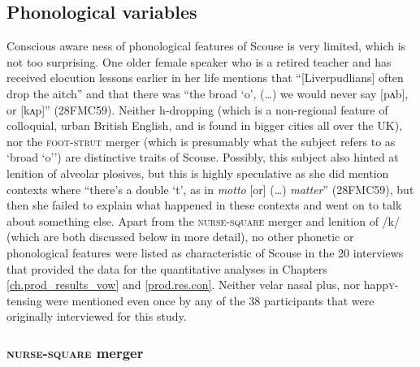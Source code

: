\subsection{Phonological variables}
\label{aware_res.phon}

Conscious aware ness of phonological features of Scouse is very limited, which is not too surprising.
One older female speaker who is a retired teacher and has received elocution lessons earlier in her life mentions that ``[Liverpudlians] often drop the aitch'' and that there was ``the broad `o', (\ldots) we would never say [pʌb], or [kʌp]'' (28FMC59).
Neither h-dropping (which is a non-regional feature of colloquial, urban British English, and is found in bigger cities all over the UK), nor the \textsc{foot}-\textsc{strut} merger (which is presumably what the subject refers to as `broad `o'') are distinctive traits of Scouse.
Possibly, this subject also hinted at lenition of alveolar plosives, but this is highly speculative as she did mention contexts where ``there's a double `t', as in \emph{motto} [or] (\ldots) \emph{matter}'' (28FMC59), but then she failed to explain what happened in these contexts and went on to talk about something else.
Apart from the \textsc{nurse}-\textsc{square} merger and lenition of /k/ (which are both discussed below in more detail), no other phonetic or phonological features were listed as characteristic of Scouse in the 20 interviews that provided the data for the quantitative analyses in Chapters \ref{ch.prod_results_vow} and \ref{prod.res.con}.
Neither velar nasal plus, nor happ\textsc{y}-tensing were mentioned even once by any of the 38 participants that were originally interviewed for this study.

\subsubsection{\textsc{nurse}-\textsc{square} merger}
\label{aware_res.phon.nurse}


